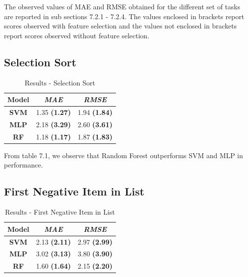 The observed values of MAE and RMSE obtained for the different set of tasks are reported in sub sections 7.2.1 - 7.2.4. The values enclosed in brackets report scores observed with feature selection and the values not enclosed in brackets report scores observed without feature selection. 

\subsection{Selection Sort}

\begin{table}[h]
\centering
\caption{Results - Selection Sort}
\begin{tabular}{|c|c|c|}
\hline
\textbf{Model} & \textit{\textbf{MAE}} & \textit{\textbf{RMSE}} \\ \hline
\textbf{SVM}   & 1.35 \textbf{(1.27)}           & 1.94 \textbf{(1.84)}            \\ \hline
\textbf{MLP}   & 2.18 \textbf{(3.29)}           & 2.60 \textbf{(3.61)}             \\ \hline
\textbf{RF}    & 1.18 \textbf{(1.17)}           & 1.87 \textbf{(1.83)}            \\ \hline
\end{tabular}

\label{tab:selsort}
\end{table}

From table 7.1, we observe that Random Forest outperforms SVM and MLP in performance. 

\newpage

\subsection{First Negative Item in List}

\begin{table}[h]
\centering
\caption{Results - First Negative Item in List}
\begin{tabular}{|c|c|c|}
\hline
\textbf{Model} & \textit{\textbf{MAE}} & \textit{\textbf{RMSE}} \\ \hline
\textbf{SVM}   & 2.13 \textbf{(2.11)}           & 2.97 \textbf{(2.99)}            \\ \hline
\textbf{MLP}   & 3.02 \textbf{(3.13)}           & 3.80 \textbf{(3.90)}            \\ \hline
\textbf{RF}    & 1.60 \textbf{(1.64)}           & 2.15 \textbf{(2.20)}            \\ \hline
\end{tabular}

\label{tab:first-neg}
\end{table}

